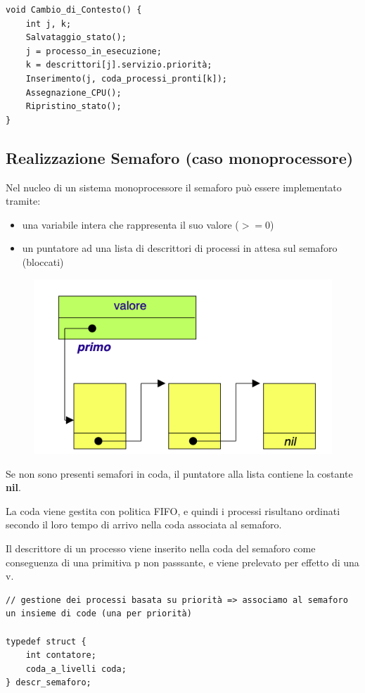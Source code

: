 \documentclass{article}
\begin{document}
\begin{lstlisting}
void Cambio_di_Contesto() {
    int j, k;
    Salvataggio_stato();
    j = processo_in_esecuzione;
    k = descrittori[j].servizio.priorità;
    Inserimento(j, coda_processi_pronti[k]);
    Assegnazione_CPU();
    Ripristino_stato();
}
\end{lstlisting}

\subsection{Realizzazione Semaforo (caso monoprocessore)}

Nel nucleo di un sistema monoprocessore il semaforo può essere implementato tramite:
\begin{itemize}
    \item una variabile intera che rappresenta il suo valore ($>=$0)
    \item un puntatore ad una lista di descrittori di processi in attesa sul semaforo (bloccati)
\end{itemize}

\begin{figure}[htbp]
    \centering
    \includegraphics[width=0.60\columnwidth]{imgs/sem_kernel.png}
\end{figure}

\vspace{3mm}
Se non sono presenti semafori in coda, il puntatore alla lista contiene la costante \textbf{nil}.

La coda viene gestita con politica FIFO, e quindi i processi risultano ordinati secondo il loro tempo di arrivo nella coda associata
al semaforo.

Il descrittore di un processo viene inserito nella coda del semaforo come conseguenza di una primitiva p non passsante, e viene prelevato
per effetto di una v.

\vspace{3mm}
\begin{lstlisting}
// gestione dei processi basata su priorità => associamo al semaforo un insieme di code (una per priorità)

typedef struct {
    int contatore;
    coda_a_livelli coda;
} descr_semaforo;
\end{lstlisting}
\end{document}
